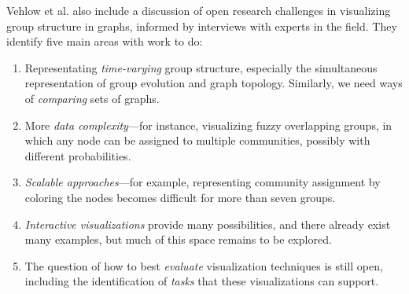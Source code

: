 
Vehlow et al. also include a discussion of open research challenges in
visualizing group structure in graphs, informed by interviews with
experts in the field. They identify five main areas with work to do:

\begin{enumerate}
\def\labelenumi{\arabic{enumi}.}
\tightlist
\item
  Representating \emph{time-varying} group structure, especially the
  simultaneous representation of group evolution and graph topology.
  Similarly, we need ways of \emph{comparing} sets of graphs.
\item
  More \emph{data complexity}---for instance, visualizing fuzzy
  overlapping groups, in which any node can be assigned to multiple
  communities, possibly with different probabilities.
\item
  \emph{Scalable approaches}---for example, representing community
  assignment by coloring the nodes becomes difficult for more than seven
  groups.
\item
  \emph{Interactive visualizations} provide many possibilities, and
  there already exist many examples, but much of this space remains to
  be explored.
\item
  The question of how to best \emph{evaluate} visualization techniques
  is still open, including the identification of \emph{tasks} that these
  visualizations can support.
\end{enumerate}

